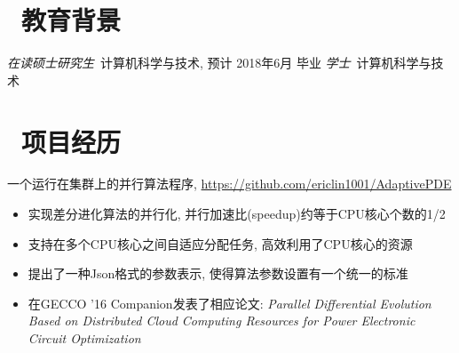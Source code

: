 \documentclass{resume}
\newcommand\quelle[1]{{%
		\unskip\nobreak\hfil\penalty50
		\hskip2em\hbox{}\nobreak\hfil #1%
\parfillskip=0pt \finalhyphendemerits=0 \par}}
\begin{document}


\basicInfo{
	\email{ericlin1001@qq.com} \textperiodcentered\ 
	\phone{(+86) 135-8053-2764} 
}

\section{\faGraduationCap\ 教育背景}
\textit{在读硕士研究生}\  计算机科学与技术, 预计 2018年6月 毕业
\textit{学士}\ 计算机科学与技术 


\section{\faUsers\ 项目经历}
一个运行在集群上的并行算法程序, \url{https://github.com/ericlin1001/AdaptivePDE}
\begin{itemize}
	\item 实现差分进化算法的并行化, 并行加速比(speedup)约等于CPU核心个数的1/2
	\item 支持在多个CPU核心之间自适应分配任务, 高效利用了CPU核心的资源
	\item 提出了一种Json格式的参数表示, 使得算法参数设置有一个统一的标准
	\item 在GECCO '16 Companion发表了相应论文: \textit{Parallel Differential Evolution Based on Distributed Cloud Computing Resources for Power Electronic Circuit Optimization} %
\end{itemize}
\end{document}
